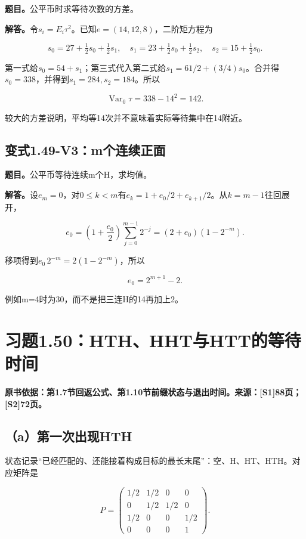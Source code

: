 \documentclass[
  11pt,
  a4paper,
  UTF8,
  fontset=fandol]{ctexart}
\begin{document}
\textbf{题目。}公平币时求等待次数的方差。

\textbf{解答。}令\(s_i=E_i\tau^2\)。已知\(e=(14,12,8)\)，二阶矩方程为

\[
s_0=27+\tfrac12s_0+\tfrac12s_1,\quad
s_1=23+\tfrac12s_0+\tfrac12s_2,\quad
s_2=15+\tfrac12s_0.
\]

第一式给\(s_0=54+s_1\)；第三式代入第二式给\(s_1=61/2+(3/4)s_0\)。合并得\(s_0=338\)，并得到\(s_1=284,s_2=184\)。所以

\[
\boxed{\operatorname{Var}_0\tau=338-14^2=142.}
\]

较大的方差说明，平均等14次并不意味着实际等待集中在14附近。

\subsection{变式1.49-V3：m个连续正面}\label{ux53d8ux5f0f1.49-v3mux4e2aux8fdeux7eedux6b63ux9762}

\textbf{题目。}公平币等待连续m个H，求均值。

\textbf{解答。}设\(e_m=0\)，对\(0\le k<m\)有\(e_k=1+e_0/2+e_{k+1}/2\)。从\(k=m-1\)往回展开，

\[
e_0=\left(1+\frac{e_0}{2}\right)\sum_{j=0}^{m-1}2^{-j}
=(2+e_0)(1-2^{-m}).
\]

移项得到\(e_0\,2^{-m}=2(1-2^{-m})\)，所以

\[
\boxed{e_0=2^{m+1}-2.}
\]

例如m=4时为30，而不是把三连H的14再加上2。

\section{习题1.50：HTH、HHT与HTT的等待时间}\label{ux4e60ux98981.50hthhhtux4e0ehttux7684ux7b49ux5f85ux65f6ux95f4}

\textbf{原书依据：第1.7节回返公式、第1.10节前缀状态与退出时间。来源：{[}S1{]}88页；{[}S2{]}72页。}

\subsection{（a）第一次出现HTH}\label{aux7b2cux4e00ux6b21ux51faux73b0hth}

状态记录``已经匹配的、还能接着构成目标的最长末尾''：空、H、HT、HTH。对应矩阵是

\[
P=\begin{pmatrix}
1/2&1/2&0&0\\0&1/2&1/2&0\\1/2&0&0&1/2\\0&0&0&1
\end{pmatrix}.
\]
\end{document}
